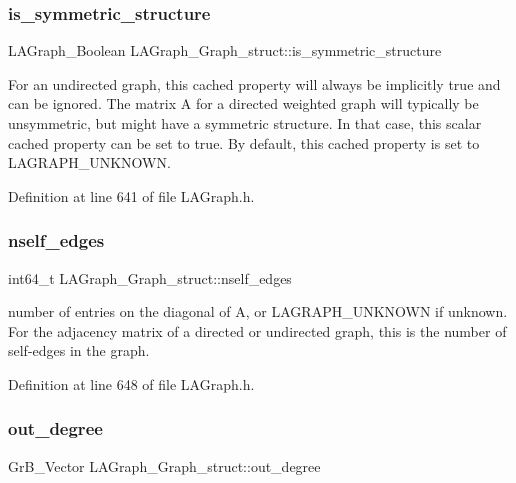\subsubsection{\texorpdfstring{is\+\_\+symmetric\+\_\+structure}{is\_symmetric\_structure}}
{\footnotesize\ttfamily L\+A\+Graph\+\_\+\+Boolean L\+A\+Graph\+\_\+\+Graph\+\_\+struct\+::is\+\_\+symmetric\+\_\+structure}

For an undirected graph, this cached property will always be implicitly true and can be ignored. The matrix A for a directed weighted graph will typically be unsymmetric, but might have a symmetric structure. In that case, this scalar cached property can be set to true. By default, this cached property is set to L\+A\+G\+R\+A\+P\+H\+\_\+\+U\+N\+K\+N\+O\+WN. 

Definition at line 641 of file L\+A\+Graph.\+h.

\mbox{\label{structLAGraph__Graph__struct_a39076f3755c663cd382bcf8a935dbf0a}} 
\subsubsection{\texorpdfstring{nself\+\_\+edges}{nself\_edges}}
{\footnotesize\ttfamily int64\+\_\+t L\+A\+Graph\+\_\+\+Graph\+\_\+struct\+::nself\+\_\+edges}

number of entries on the diagonal of A, or L\+A\+G\+R\+A\+P\+H\+\_\+\+U\+N\+K\+N\+O\+WN if unknown. For the adjacency matrix of a directed or undirected graph, this is the number of self-\/edges in the graph. 

Definition at line 648 of file L\+A\+Graph.\+h.

\mbox{\label{structLAGraph__Graph__struct_a80f2da5366a6f2395b91b158d5ee509c}} 
\subsubsection{\texorpdfstring{out\+\_\+degree}{out\_degree}}
{\footnotesize\ttfamily Gr\+B\+\_\+\+Vector L\+A\+Graph\+\_\+\+Graph\+\_\+struct\+::out\+\_\+degree}

